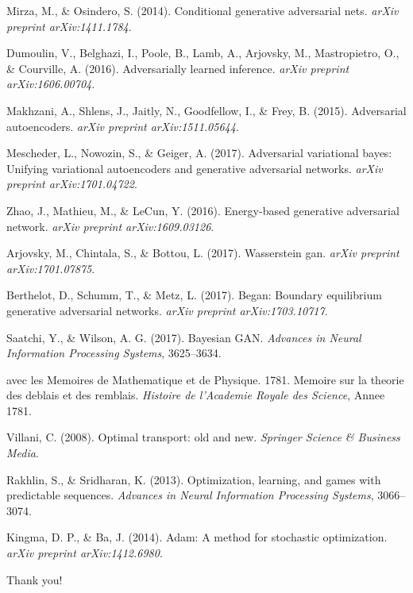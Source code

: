 \documentclass{beamer}
\begin{document}
\begin{frame}[allowframebreaks]
{\begin{thebibliography}{99}
 Mirza, M., \& Osindero, S. (2014).
\newblock Conditional generative adversarial nets.
\newblock \emph{arXiv preprint arXiv:1411.1784}.

 Dumoulin, V., Belghazi, I., Poole, B., Lamb, A., Arjovsky, M., Mastropietro, O., \& Courville, A. (2016).
\newblock Adversarially learned inference.
\newblock \emph{arXiv preprint arXiv:1606.00704}.

 Makhzani, A., Shlens, J., Jaitly, N., Goodfellow, I., \& Frey, B. (2015).
\newblock Adversarial autoencoders.
\newblock \emph{arXiv preprint arXiv:1511.05644}.

 Mescheder, L., Nowozin, S., \& Geiger, A. (2017).
\newblock Adversarial variational bayes: Unifying variational autoencoders and generative adversarial networks.
\newblock \emph{arXiv preprint arXiv:1701.04722}.

 Zhao, J., Mathieu, M., \& LeCun, Y. (2016).
\newblock Energy-based generative adversarial network.
\newblock \emph{arXiv preprint arXiv:1609.03126}.

 Arjovsky, M., Chintala, S., \& Bottou, L. (2017).
\newblock Wasserstein gan.
\newblock \emph{arXiv preprint arXiv:1701.07875}.

 Berthelot, D., Schumm, T., \& Metz, L. (2017).
\newblock Began: Boundary equilibrium generative adversarial networks.
\newblock \emph{arXiv preprint arXiv:1703.10717}.

 Saatchi, Y., \& Wilson, A. G. (2017).
\newblock Bayesian GAN.
\newblock \emph{Advances in Neural Information Processing Systems}, 3625--3634.

 avec les Memoires de Mathematique et de Physique. 1781.
\newblock Memoire sur la theorie des deblais et des remblais.
\newblock \emph{Histoire de l'Academie Royale des Science}, Annee 1781.

 Villani, C. (2008).
\newblock Optimal transport: old and new.
\newblock \emph{Springer Science \& Business Media}.

 Rakhlin, S., \& Sridharan, K. (2013).
\newblock Optimization, learning, and games with predictable sequences.
\newblock \emph{Advances in Neural Information Processing Systems}, 3066--3074.

 Kingma, D. P., \& Ba, J. (2014).
\newblock Adam: A method for stochastic optimization.
\newblock \emph{arXiv preprint arXiv:1412.6980}.

\end{thebibliography}}
\Huge{\centerline{Thank you!}}
\end{frame}
\end{document}

